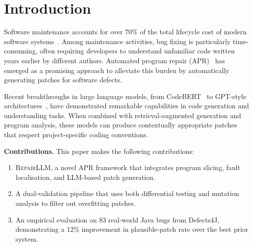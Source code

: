 \section{Introduction}

Software maintenance accounts for over 70\% of the total lifecycle cost of
modern software systems~\cite{boehm1981software}. Among maintenance activities,
bug fixing is particularly time-consuming, often requiring developers to
understand unfamiliar code written years earlier by different authors.
Automated program repair (APR)~\cite{goues2019automated} has emerged as a
promising approach to alleviate this burden by automatically generating
patches for software defects.

Recent breakthroughs in large language models, from CodeBERT~\cite{feng2020codebert}
to GPT-style architectures~\cite{brown2020language}, have demonstrated
remarkable capabilities in code generation and understanding tasks.
When combined with retrieval-augmented generation and program analysis,
these models can produce contextually appropriate patches that respect
project-specific coding conventions.

\textbf{Contributions.} This paper makes the following contributions:

\begin{enumerate}
  \item \textsc{RepairLLM}, a novel APR framework that integrates program
        slicing, fault localisation, and LLM-based patch generation.
  \item A dual-validation pipeline that uses both differential testing and
        mutation analysis to filter out overfitting patches.
  \item An empirical evaluation on 83 real-world Java bugs from Defects4J,
        demonstrating a 12\% improvement in plausible-patch rate over the
        best prior system.
\end{enumerate}

